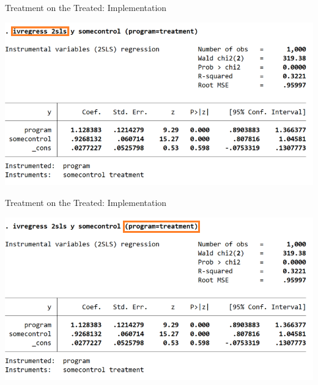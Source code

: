 \documentclass[10pt,xcolor=table,ignorenonframetext,aspectratio=169]{beamer}
\begin{document}

\begin{frame}{Treatment on the Treated:  Implementation}

\medskip
\begin{center}
	\includegraphics[width=\textwidth]{img/StataIV1a.png}
\end{center}

\end{frame}



\begin{frame}{Treatment on the Treated:  Implementation}

\medskip
\begin{center}
	\includegraphics[width=\textwidth]{img/StataIV1b.png}
\end{center}

\end{frame}


\end{document}
